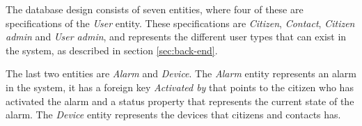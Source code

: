 The database design consists of seven entities, where four of these are specifications of the \textit{User} entity. These specifications are \textit{Citizen}, \textit{Contact}, \textit{Citizen admin} and \textit{User admin}, and represents the different user types that can exist in the system, as described in section \ref{sec:back-end}. 

The last two entities are \textit{Alarm} and \textit{Device}. The \textit{Alarm} entity represents an alarm in the system, it has a foreign key \textit{Activated by} that points to the citizen who has activated the alarm and a status property that represents the current state of the alarm. The \textit{Device} entity represents the devices that citizens and contacts has.